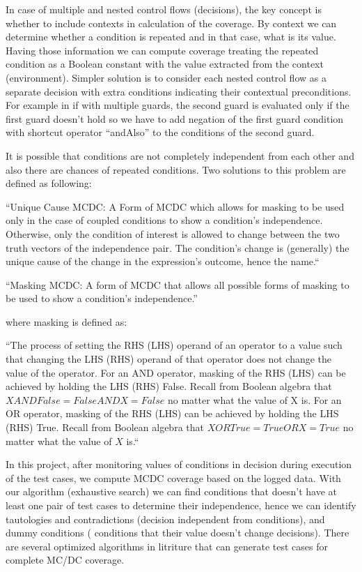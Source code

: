 \documentclass[12pt,a4paper]{report}
\begin{document}
In case of multiple and nested control flows (decisions), the key concept is whether to include contexts in calculation of the coverage. By context we can
 determine whether a condition is repeated and in that case, what is its value. Having those information we can compute coverage treating the repeated
 condition as a Boolean constant with the value extracted from the context (environment). Simpler solution is to consider each nested control flow as a
 separate decision with extra conditions indicating their contextual preconditions. For example in if with multiple guards, the second guard is evaluated
 only if the first guard doesn’t hold so we have to add negation of the first guard condition with shortcut operator “andAlso” to the conditions of the
 second guard.

It is possible that conditions are not completely independent from each other and also there are chances of repeated conditions. Two solutions to this
 problem are defined as following:

“Unique Cause MCDC: A Form of MCDC which allows for masking to be used only in the case of coupled conditions to show a condition’s independence.
 Otherwise, only the condition of interest is allowed to change between the two truth vectors of the independence pair. The condition’s change is
 (generally) the unique cause of the change in the expression’s outcome, hence the name.“\cite{chilenski2001investigation}

“Masking MCDC: A form of MCDC that allows all possible forms of masking to be used to show a condition’s independence.”\cite{chilenski2001investigation}

where masking is defined as:

“The process of setting the RHS (LHS) operand of an operator to a value such that changing the LHS (RHS) operand of that operator does not change the
 value of the operator. For an AND operator, masking of the RHS (LHS) can be achieved by holding the LHS (RHS) False.  Recall from Boolean algebra that
 $X AND False = False AND X = False$ no matter what the value of X is. For an OR operator, masking of the RHS (LHS) can be achieved by holding the LHS
 (RHS) True. Recall from Boolean algebra that $X OR True = True OR X = True$ no matter what the value of $X$ is.“\cite{chilenski2001investigation}

In this project, after monitoring values of conditions in decision during execution of the test cases, we compute MCDC coverage based on the logged data.
 With our algorithm (exhaustive search) we can find conditions that doesn’t have at least one pair of test cases to determine their independence, hence we
 can identify tautologies and contradictions (decision independent from conditions), and dummy conditions ( conditions that their value doesn’t change
 decisions). There are several optimized algorithms in litriture that can generate test cases for complete MC/DC coverage.
\end{document}
